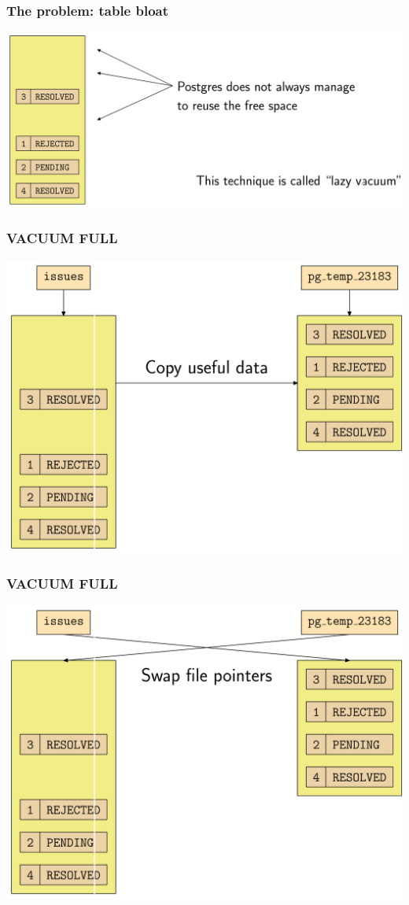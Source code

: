 \begin{frame}
  \frametitle{The problem: table bloat}
  \includegraphics[height=\sizeforimages\textheight]{images/bloat_02.png}
\end{frame}

\begin{frame}
  \frametitle{VACUUM FULL}
  \includegraphics[height=\sizeforimages\textheight]{images/vacuum_full_01.png}
\end{frame}

\begin{frame}
  \frametitle{VACUUM FULL}
  \includegraphics[height=\sizeforimages\textheight]{images/vacuum_full_02.png}
\end{frame}

